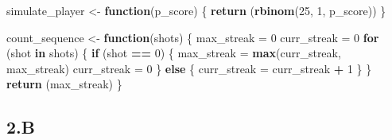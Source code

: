 \documentclass[
]{article}
\newenvironment{Shaded}{\begin{snugshade}}{\end{snugshade}}
\newcommand{\ControlFlowTok}[1]{\textcolor[rgb]{0.13,0.29,0.53}{\textbf{#1}}}
\newcommand{\DecValTok}[1]{\textcolor[rgb]{0.00,0.00,0.81}{#1}}
\newcommand{\FunctionTok}[1]{\textcolor[rgb]{0.13,0.29,0.53}{\textbf{#1}}}
\newcommand{\NormalTok}[1]{#1}
\newcommand{\OtherTok}[1]{\textcolor[rgb]{0.56,0.35,0.01}{#1}}
\newcommand{\SpecialCharTok}[1]{\textcolor[rgb]{0.81,0.36,0.00}{\textbf{#1}}}
\begin{document}
\begin{Shaded}
\begin{Highlighting}[]
\NormalTok{simulate\_player }\OtherTok{\textless{}{-}} \ControlFlowTok{function}\NormalTok{(p\_score) \{}
  \FunctionTok{return}\NormalTok{ (}\FunctionTok{rbinom}\NormalTok{(}\DecValTok{25}\NormalTok{, }\DecValTok{1}\NormalTok{, p\_score))}
\NormalTok{\}}

\NormalTok{count\_sequence }\OtherTok{\textless{}{-}} \ControlFlowTok{function}\NormalTok{(shots) \{}
\NormalTok{  max\_streak }\OtherTok{=} \DecValTok{0}
\NormalTok{  curr\_streak }\OtherTok{=} \DecValTok{0}
  \ControlFlowTok{for}\NormalTok{ (shot }\ControlFlowTok{in}\NormalTok{ shots) \{}
    \ControlFlowTok{if}\NormalTok{ (shot }\SpecialCharTok{==} \DecValTok{0}\NormalTok{) \{}
\NormalTok{      max\_streak }\OtherTok{=} \FunctionTok{max}\NormalTok{(curr\_streak, max\_streak)}
\NormalTok{      curr\_streak }\OtherTok{=} \DecValTok{0}
\NormalTok{    \}}
    \ControlFlowTok{else}\NormalTok{ \{}
\NormalTok{      curr\_streak }\OtherTok{=}\NormalTok{ curr\_streak }\SpecialCharTok{+} \DecValTok{1}
\NormalTok{    \}}
\NormalTok{  \}}
  \FunctionTok{return}\NormalTok{ (max\_streak)}
\NormalTok{\}}
\end{Highlighting}
\end{Shaded}

\hypertarget{b}{%
\subsection{2.B}\label{b}}
\end{document}
